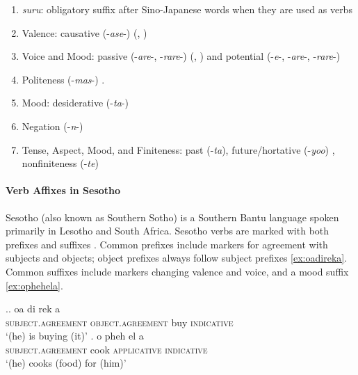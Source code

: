 \begin{enumerate}
\item \textit{suru}: obligatory suffix after Sino-Japanese words when they are used as verbs
\item Valence: causative (-\textit{ase}-) (\citet[142]{hasegawa2014japanese}, \citet[Chapter 13]{kaiser2013japanese})
\item Voice and Mood: passive (-\textit{are}-, -\textit{rare}-) (\citet[152]{hasegawa2014japanese}, \citet[Chapter 12]{kaiser2013japanese}) and potential (-\textit{e}-, -\textit{are}-, -\textit{rare}-) \citep[398]{kaiser2013japanese}  
\item Politeness (-\textit{mas}-) \citep[190]{kaiser2013japanese}.
\item Mood: desiderative (-\textit{ta}-) \citep[238]{kaiser2013japanese}
\item Negation (-\textit{n}-)
\item Tense, Aspect, Mood, and Finiteness: past (-\textit{ta}), future/hortative (-\textit{yoo}) \citep[229]{kaiser2013japanese}, nonfiniteness (-\textit{te}) \citep[186]{kaiser2013japanese}
\end{enumerate}







\paragraph{Verb Affixes in Sesotho}
Sesotho (also known as Southern Sotho) is a Southern Bantu language spoken primarily in Lesotho and South Africa.
Sesotho verbs are marked with both prefixes and suffixes \citep{demuth1992acquisition}.
Common prefixes include markers for agreement with subjects and objects; object prefixes always follow subject prefixes \ref{ex:oadireka}.
Common suffixes include markers changing valence and voice, and a mood suffix \ref{ex:ophehela}.

\ex.\ag. oa di rek a \\
\textsc{subject.agreement} \textsc{object.agreement} buy \textsc{indicative} \\
`(he) is buying (it)'  \citep{demuth1992acquisition} \label{ex:oadireka}
\bg. o pheh el a \\
\textsc{subject.agreement} cook \textsc{applicative} \textsc{indicative} \\
`(he) cooks (food) for (him)'  \citep{demuth1992acquisition}
\label{ex:ophehela}

